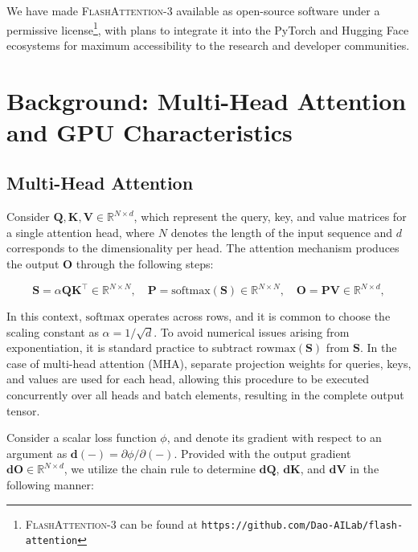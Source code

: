 \begin{enumerate}
We have made \textsc{FlashAttention-3} available as open-source software under a permissive license\footnote{\textsc{FlashAttention-3}
  can be found at \texttt{https://github.com/Dao-AILab/flash-attention}}, with plans to integrate it into the PyTorch and Hugging Face ecosystems for maximum accessibility to the research and developer communities.

\section{Background: Multi-Head Attention and GPU Characteristics}
\label{sec:background}

\subsection{Multi-Head Attention}
\label{subsec:multi_head_attn}

Consider $\mathbf{Q}, \mathbf{K}, \mathbf{V} \in \mathbb{R}^{N \times d}$, which represent the query, key, and value matrices for a single attention head, where $N$ denotes the length of the input sequence and $d$ corresponds to the dimensionality per head. The attention mechanism produces the output $\mathbf{O}$ through the following steps:

\begin{equation*}
  \mathbf{S} = \alpha \mathbf{Q} \mathbf{K}^\top \in \mathbb{R}^{N \times N}, \quad \mathbf{P} = \mathrm{softmax}(\mathbf{S}) \in \mathbb{R}^{N \times N}, \quad \mathbf{O} = \mathbf{P}\mathbf{V} \in \mathbb{R}^{N \times d},
\end{equation*}

In this context, $\mathrm{softmax}$ operates across rows, and it is common to choose the scaling constant as $\alpha = 1/\sqrt{d}$. To avoid numerical issues arising from exponentiation, it is standard practice to subtract $\mathrm{rowmax}(\mathbf{S})$ from $\mathbf{S}$. In the case of multi-head attention (MHA), separate projection weights for queries, keys, and values are used for each head, allowing this procedure to be executed concurrently over all heads and batch elements, resulting in the complete output tensor.

Consider a scalar loss function $\phi$, and denote its gradient with respect to an argument as $\mathbf{d}(-) = \partial \phi / \partial (-)$. Provided with the output gradient $\mathbf{dO} \in \mathbb{R}^{N \times d}$, we utilize the chain rule to determine $\mathbf{dQ}$, $\mathbf{dK}$, and $\mathbf{dV}$ in the following manner:


\end{enumerate}
